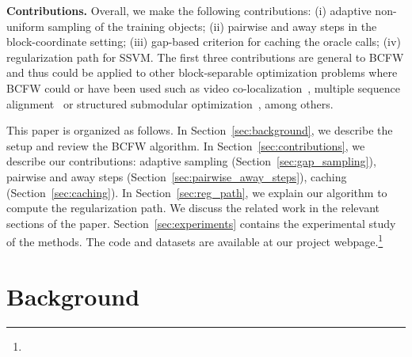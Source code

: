 \documentclass{article}
\begin{document}
\textbf{Contributions.} Overall, we make the following contributions:
(i) adaptive non-uniform sampling of the training objects;
(ii) pairwise and away steps in the block-coordinate setting;
(iii) gap-based criterion for caching the oracle calls;
(iv) regularization path for SSVM. The first three contributions are general to BCFW and thus could be applied to other block-separable optimization problems where BCFW could or have been used such as video co-localization~\citep{joulin2014video}, multiple sequence alignment~\citep[App.~B]{alayrac2016MSA}
%
or structured submodular optimization~\citep{jegelka2013reflection}, among others.

This paper is organized as follows. In Section~\ref{sec:background}, we describe the setup and review the BCFW algorithm. In Section~\ref{sec:contributions}, we describe our contributions: adaptive sampling (Section~\ref{sec:gap_sampling}), pairwise and away steps (Section~\ref{sec:pairwise_away_steps}), caching (Section~\ref{sec:caching}).
In Section~\ref{sec:reg_path}, we explain our algorithm to compute the regularization path.
We discuss the related work in the relevant sections of the paper. 
Section~\ref{sec:experiments} contains the experimental study of the methods.
The code and datasets are available at our project webpage.\footnote{}

%
%
%
%
%
%
%
%
%
%


%
%
%
%
%
%
%
%
%
%
%
%
%
%
%
%
%
%
%
%
%
%
%
%
%
%
%
%
%
%
%
%

\section{Background \label{sec:background}}
\end{document}
